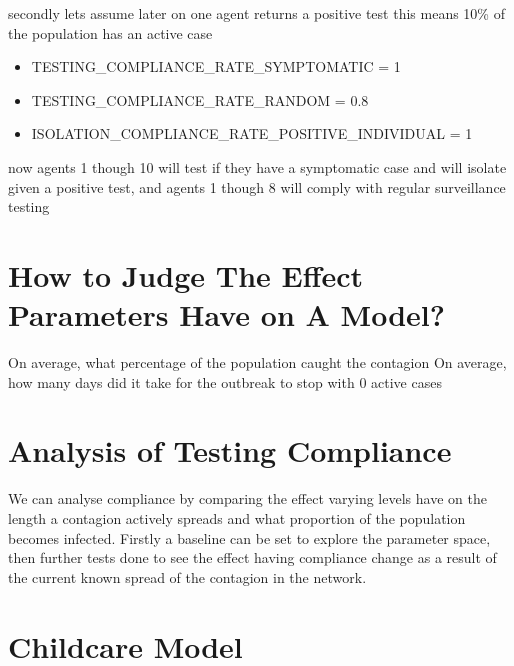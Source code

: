 \documentclass{article}
\begin{document}
secondly lets assume later on one agent returns a positive test this means 10\% of the population has an active case
\begin{itemize}
\item TESTING\_COMPLIANCE\_RATE\_SYMPTOMATIC = 1\
\item TESTING\_COMPLIANCE\_RATE\_RANDOM = 0.8 \
\item ISOLATION\_COMPLIANCE\_RATE\_POSITIVE\_INDIVIDUAL = 1
\end{itemize}
now agents 1 though 10 will test if they have a symptomatic case and will isolate given a positive test, and agents 1 though 8 will comply with regular surveillance testing

\section{How to Judge The Effect Parameters Have on A Model?}
On average, what percentage of the population caught the contagion
On average, how many days did it take for the outbreak to stop with 0 active cases


\section{Analysis of Testing Compliance}
We can analyse compliance by comparing the effect varying levels have on the length a contagion actively spreads and what proportion of the population becomes infected. Firstly a baseline can be set to explore the parameter space, then further tests done to see the effect having compliance change as a result of the current known spread of the contagion in the network.


\section{Childcare Model}
\end{document}
